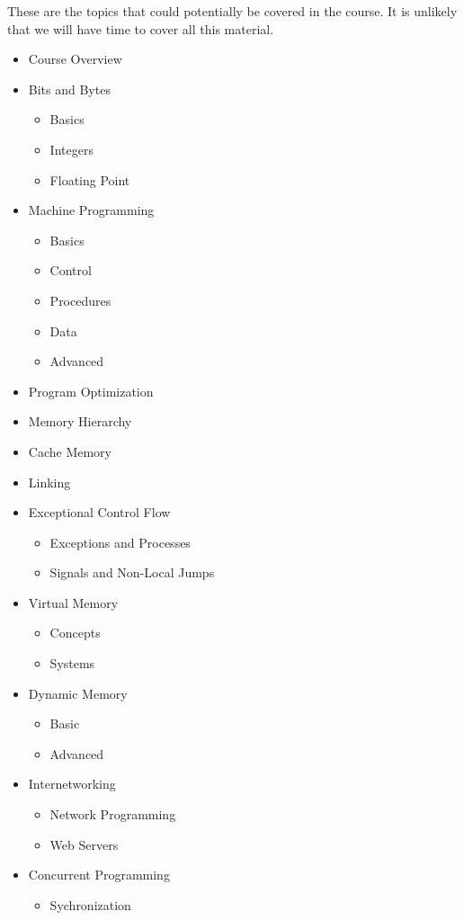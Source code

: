 \documentclass[11pt]{article}
\begin{document}
These are the topics that could potentially be covered in the course.
It is unlikely that we will have time to cover all this material.
\begin{itemize}
\item Course Overview
\item Bits and Bytes
  \begin{itemize}
  \item Basics
  \item Integers
  \item Floating Point
  \end{itemize}
\item Machine Programming
  \begin{itemize}
  \item Basics
  \item Control
  \item Procedures
  \item Data
  \item Advanced
  \end{itemize}
\item Program Optimization
\item Memory Hierarchy
\item Cache Memory
\item Linking
\item Exceptional Control Flow
  \begin{itemize}
  \item Exceptions and Processes
  \item Signals and Non-Local Jumps
  \end{itemize}
\item Virtual Memory
  \begin{itemize}
  \item Concepts
  \item Systems
  \end{itemize}
\item Dynamic Memory
  \begin{itemize}
  \item Basic
  \item Advanced
  \end{itemize}
\item Internetworking
  \begin{itemize}
  \item Network Programming
  \item Web Servers
  \end{itemize}
\item Concurrent Programming
  \begin{itemize}
  \item Sychronization
  \end{itemize}
\end{itemize}
\end{document}
